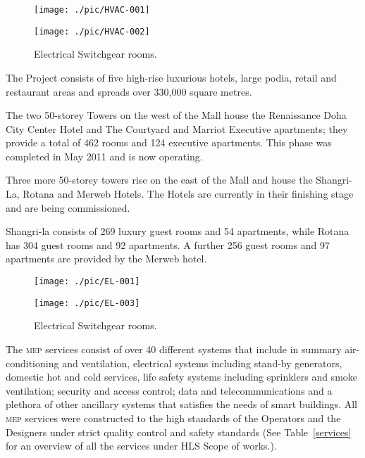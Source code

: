 \documentclass[oneside, justified, 11pt, a4paper]{tufte-book}
\begin{document}
\begin{fullwidth}
\begin{figure*}[btp]
\texttt{[image: ./pic/HVAC-001]}
\vspace*{1pt}

\texttt{[image: ./pic/HVAC-002]}
\vspace*{1pt}

\caption{Electrical Switchgear rooms.}
\end{figure*}
\end{fullwidth}

The Project consists of five high-rise luxurious hotels, large podia,
retail and restaurant areas and spreads over 330,000 square metres. 

The two 50-storey Towers on the west of the Mall house the Renaissance Doha City Center Hotel and The Courtyard and Marriot Executive apartments; they provide a total of 462 rooms and 124 executive apartments. This phase was completed in May 2011 and is now operating.

Three more 50-storey towers rise on the east of the Mall and house the Shangri-La, Rotana and Merweb Hotels. The Hotels are currently in their finishing stage and are being commissioned.

Shangri-la consists of  269 luxury guest rooms and 54 apartments, while Rotana  has 304 guest rooms and 92 apartments. A further 256 guest rooms and 97 apartments are provided by the Merweb hotel.



\begin{figure*}[btp]
\begin{fullwidth}
\texttt{[image: ./pic/EL-001]}
\vspace*{1pt}

\texttt{[image: ./pic/EL-003]}
\vspace*{1pt}

\caption{Electrical Switchgear rooms.}
\end{fullwidth}
\end{figure*}


The \textsc{mep} services consist of over 40 different systems that include in summary air-conditioning and ventilation, electrical systems including stand-by generators, domestic hot and cold services,  life safety systems including sprinklers and smoke ventilation; security and access control; data and telecommunications and a plethora of other ancillary systems that satisfies the needs of smart buildings. All \textsc{mep} services were constructed to the high standards of the Operators and the Designers under strict quality control and safety standards (See Table~\ref{services} for an overview of all the services under HLS Scope of works.).
\end{document}

